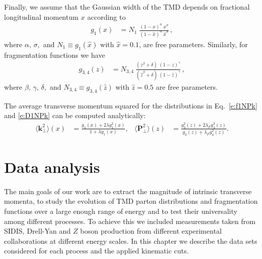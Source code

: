 \documentclass[aps,preprintnumbers,showpacs,nofootinbib,superscriptaddress,floatfix]{revtex4}
\begin{document}
Finally, we assume that the Gaussian width of the TMD depends on 
fractional longitudinal momentum $x$ according to
\begin{align} 
 g_1 (x) &= N_1 \;  
\frac{(1-x)^{\alpha} \  x^{\sigma} }{ (1 - \hat{x})^{\alpha} \  \hat{x}^{\sigma} } \, ,
\label{e:kT2_kin}
\end{align}
where $\alpha, \, \sigma,$ and $N_1 \equiv  g_1 (\hat{x})$ with $\hat{x} = 0.1$,
are free parameters. Similarly, for fragmentation functions we have
\begin{align}  
g_{3,4} (z) &= N_{3,4} \  
               \frac{ (z^{\beta} + \delta)\ (1-z)^{\gamma} }{ (\hat{z}^{\beta} + \delta)\   (1 - \hat{z})^{\gamma} } \, ,
 \label{e:PT2_kin}
 \end{align}
where $\beta, \, \gamma, \, \delta, $ and $N_{3,4} \equiv g_{3,4} (\hat{z})$ with
$\hat{z} = 0.5$ 
are free parameters. 

The average transverse momentum squared for the distributions in
Eq.~\eqref{e:f1NPk} and \eqref{e:D1NPk} can be computed analytically:
\begin{align}
\big \langle \bm{k}_{\perp}^2 \big \rangle (x) &= \frac{g_1(x) + 2 \lambda g_1^2(x)}
{1+ \lambda g_1(x)},
&
\big \langle \bm{P}_{\perp}^2 \big \rangle (z) &= \frac{g_3^2(z) + 2 \lambda_F
  g_4^3(z)}{g_3(z) + \lambda_F g_4^2(z)}.
\label{e:transmom2}
\end{align} 

\section{Data analysis}
\label{s:data_analysis}


The main goals of our work are to extract the magnitude of intrinsic transverse momenta, to study the evolution of TMD parton distributions and fragmentation functions over a large enough range of energy and to test their universality among different processes.
To achieve this we included measurements taken from SIDIS, Drell-Yan and $Z$ boson production from different experimental collaborations at different energy scales.
In this chapter we describe the data sets considered for each process and the applied kinematic cuts.
\end{document}
